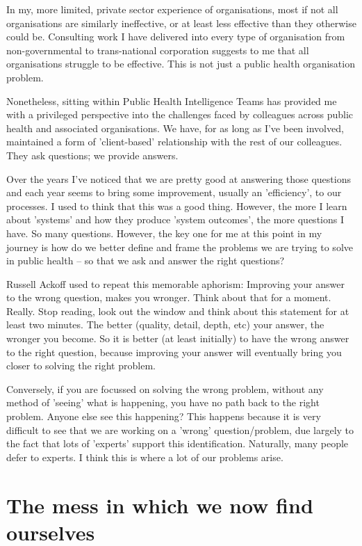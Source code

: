 In my, more limited, private sector experience of organisations, most if not all organisations are similarly ineffective, or at least less effective than they otherwise could be. Consulting work I have delivered into every type of organisation from non-governmental to trans-national corporation suggests to me that all organisations struggle to be effective. This is not just a public health organisation problem.

Nonetheless, sitting within Public Health Intelligence Teams has provided me with a privileged perspective into the challenges faced by colleagues across public health and associated organisations. We have, for as long as I've been involved, maintained a form of 'client-based' relationship with the rest of our colleagues. They ask questions; we provide answers.

Over the years I've noticed that we are pretty good at answering those questions and each year seems to bring some improvement, usually an 'efficiency', to our processes. I used to think that this was a good thing. However, the more I learn about 'systems' and how they produce 'system outcomes', the more questions I have. So many questions. However, the key one for me at this point in my journey is how do we better define and frame the problems we are trying to solve in public health -- so that we ask and answer the right questions?

Russell Ackoff used to repeat this memorable aphorism: Improving your answer to the wrong question, makes you wronger. Think about that for a moment. Really. Stop reading, look out the window and think about this statement for at least two minutes. The better (quality, detail, depth, etc) your answer, the wronger you become. So it is better (at least initially) to have the wrong answer to the right question, because improving your answer will eventually bring you closer to solving the right problem. 

Conversely, if you are focussed on solving the wrong problem, without any method of 'seeing' what is happening, you have no path back to the right problem. Anyone else see this happening? This happens because it is very difficult to see that we are working on a 'wrong' question/problem, due largely to the fact that lots of 'experts' support this identification. Naturally, many people defer to experts. I think this is where a lot of our problems arise.

\section{The mess in which we now find ourselves}

